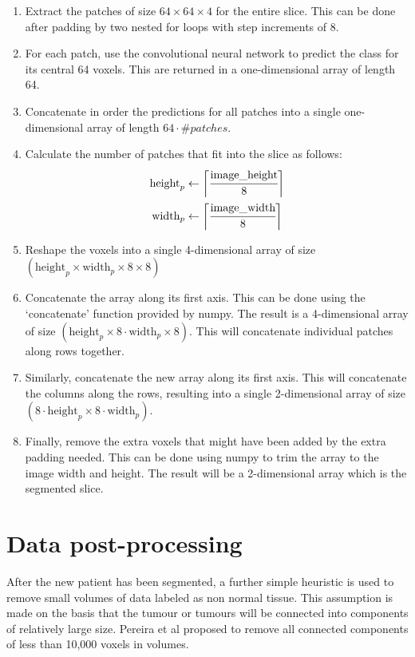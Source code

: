 \documentclass[12pt,a4paper,twoside,openright]{report}
\begin{document}
\begin{enumerate}
	\item Extract the patches of size $64 \times 64 \times 4$ for the entire slice. This can be done after padding by two nested for loops with step increments of 8.
	\item For each patch, use the convolutional neural network to predict the class for its central 64 voxels. This are returned in a one-dimensional array of length 64.
	\item Concatenate in order the predictions for all patches into a single one-dimensional array of length $64 \cdot \#patches$.
	\item Calculate the number of patches that fit into the slice as follows:
		\begin{equation}
		\begin{split}
			\text{height}_p & \gets \bigg \lceil \cfrac{\text{image\_height}}{8} \bigg \rceil 	 \\
			\text{width}_p & \gets \bigg \lceil \cfrac{\text{image\_width}}{8} \bigg \rceil 	 \\
		\end{split}		
		\end{equation}
	\item Reshape the voxels into a single 4-dimensional array of size $(\text{height}_p \times \text{width}_p \times 8 \times 8)$
	\item Concatenate the array along its first axis. This can be done using the `concatenate' function provided by numpy. The result is a 4-dimensional array of size $(\text{height}_p \times 8 \cdot \text{width}_p \times 8)$. This will concatenate individual patches along rows together.
	\item Similarly, concatenate the new array along its first axis. This will concatenate the columns along the rows, resulting into a single 2-dimensional array of size $(8 \cdot \text{height}_p \times 8 \cdot \text{width}_p)$.
	\item Finally, remove the extra voxels that might have been added by the extra padding needed. This can be done using numpy to trim the array to the image width and height. The result will be a 2-dimensional array which is the segmented slice.
\end{enumerate}


\section{Data post-processing}
After the new patient has been segmented, a further simple heuristic is used to remove small volumes of data labeled as non normal tissue. This assumption is made on the basis that the tumour or tumours will be connected into components of relatively large size. Pereira et al \cite{pereira} proposed to remove all connected components of less than 10,000 voxels in volumes.
\end{document}

